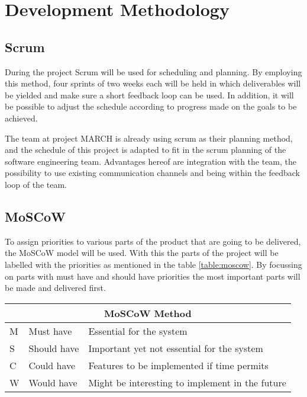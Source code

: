 \section{Development Methodology}\label{sec:devmet}

\subsection{Scrum}
During the project Scrum will be used for scheduling and planning. By employing this method, four sprints of two weeks each will be held in which deliverables will be yielded and make sure a short feedback loop can be used. In addition, it will be possible to adjust the schedule according to progress made on the goals to be achieved.

The team at project MARCH is already using scrum as their planning method, and the schedule of this project is adapted to fit in the scrum planning of the software engineering team. Advantages hereof are integration with the team, the possibility to use existing communication channels and being within the feedback loop of the team.

\subsection{MoSCoW}
To assign priorities to various parts of the product that are going to be delivered, the MoSCoW model will be used. With this the parts of the project will be labelled with the priorities as mentioned in the table \ref{table:moscow}. By focussing on parts with must have and should have priorities the most important parts will be made and delivered first.\\[1cm]

{\renewcommand{\arraystretch}{1.5}
	\centering
	
	\begin{tabular}{ | l | l | l | }
		\multicolumn{3}{c}{\bfseries{MoSCoW Method}} \\ \hline
		M & Must have & Essential for the system\\ \hline
		S & Should have & Important yet not essential for the system \\ \hline
		C & Could have & Features to be implemented if time permits \\ \hline
		W & Would have & Might be interesting to implement in the future \\ \hline 
	\end{tabular}
	\label{table:moscow}
	
}
